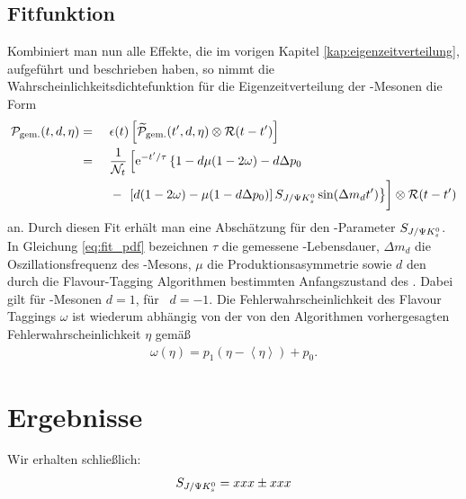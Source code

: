 \subsection{Fitfunktion}
Kombiniert man nun alle Effekte, die im vorigen Kapitel \ref{kap:eigenzeitverteilung}, aufgeführt und beschrieben haben, so nimmt die Wahrscheinlichkeitsdichtefunktion für die Eigenzeitverteilung der \Bd-Mesonen die Form
\begin{alignat}{3}
\nonumber\mathcal{P}_{\text{gem.}}(t, d, \eta) &=\  &&  \epsilon(t)\left[\widetilde{\mathcal{P}}_{\text{gem.}}(t', d, \eta) \otimes \mathcal{R}(t-t')\right]\\
\nonumber &= &&\frac{1}{\mathcal{N}_t}\left[\e^{-t'/\tau} \left\lbrace 1-d\mu(1-2\omega)-d\Delta p_0 \right.\right.\\
& &&-\left.\vphantom{\frac{1}{\mathcal{N}_t}}\left.\left[d(1-2\omega)-\mu(1-d\Delta p_0)\right]\SJPsi\sin(\Delta m_d t')\right\rbrace\right]\otimes\mathcal{R}(t-t') \label{eq:fit_pdf}
\end{alignat}
an. Durch diesen Fit erhält man eine Abschätzung für den \CP-Parameter $S_{J/\Psi K_s^0}$. In Gleichung \ref{eq:fit_pdf} bezeichnen $\tau$ die gemessene \Bd-Lebensdauer, $\Delta m_d$ die Oszillationsfrequenz des \Bd-Mesons, $\mu$ die Produktionsasymmetrie sowie $d$ den durch die Flavour-Tagging Algorithmen bestimmten Anfangszustand des \Bd. Dabei gilt für \Bd-Mesonen $d=1$, für \Bdbar\ $d=-1$. Die Fehlerwahrscheinlichkeit des Flavour Taggings $\omega$ ist wiederum abhängig von der von den Algorithmen vorhergesagten Fehlerwahrscheinlichkeit $\eta$ gemäß
\begin{align}
\omega(\eta) = p_1\left(\eta-\left\langle\eta\right\rangle\right) + p_0.
\end{align}


\section{Ergebnisse} \label{kap:fitergebnis}
Wir erhalten schließlich:
\begin{align}
S_{J/\Psi K_s^0} = xxx \pm xxx     \label{eq:fit_result}
\end{align}
